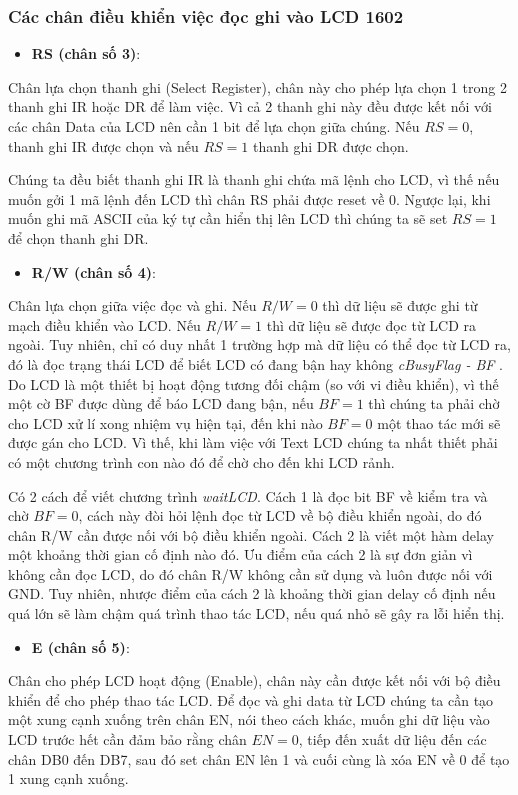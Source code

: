 \subsubsection{Các chân điều khiển việc đọc ghi vào LCD 1602}
\begin{itemize}
    \item \textbf{RS (chân số 3)}:
\end{itemize}
Chân lựa chọn thanh ghi (Select Register), chân này cho phép lựa chọn 1 trong 2 thanh ghi IR hoặc DR để làm việc.
Vì cả 2 thanh ghi này đều được kết nối với các chân Data của LCD nên cần 1 bit để lựa chọn giữa chúng.
Nếu \(RS = 0\), thanh ghi IR được chọn và nếu \(RS = 1\) thanh ghi DR được chọn.

Chúng ta đều biết thanh ghi IR là thanh ghi chứa mã lệnh cho LCD,
vì thế nếu muốn gởi 1 mã lệnh đến LCD thì chân RS phải được reset về 0.
Ngược lại, khi muốn ghi mã ASCII của ký tự cần hiển thị lên LCD thì chúng ta sẽ set \(RS = 1\) để chọn thanh ghi DR.
\begin{itemize}
    \item \textbf{R/W (chân số 4)}:
\end{itemize}
Chân lựa chọn giữa việc đọc và ghi.
Nếu \(R/W = 0\) thì dữ liệu sẽ được ghi từ mạch điều khiển vào LCD.
Nếu \(R/W = 1\) thì dữ liệu sẽ được đọc từ LCD ra ngoài.
Tuy nhiên, chỉ có duy nhất 1 trường hợp mà dữ liệu có thể đọc từ LCD ra,
đó là đọc trạng thái LCD để biết LCD có đang bận hay không \emph{cBusyFlag - BF} .
Do LCD là một thiết bị hoạt động tương đối chậm (so với vi điều khiển),
vì thế một cờ BF được dùng để báo LCD đang bận, nếu \(BF = 1\) thì chúng ta phải chờ cho LCD xử lí xong nhiệm vụ hiện tại,
đến khi nào \(BF = 0\) một thao tác mới sẽ được gán cho LCD.
Vì thế, khi làm việc với Text LCD chúng ta nhất thiết phải có một chương trình con nào đó để chờ cho đến khi LCD rảnh.

Có 2 cách để viết chương trình \emph{waitLCD}.
Cách 1 là đọc bit BF về kiểm tra và chờ \(BF = 0\),
cách này đòi hỏi lệnh đọc từ LCD về bộ điều khiển ngoài, do đó chân R/W cần được nối với bộ điều khiển ngoài.
Cách 2 là viết một hàm delay một khoảng thời gian cố định nào đó. %
Ưu điểm của cách 2 là sự đơn giản vì không cần đọc LCD, do đó chân R/W không cần sử dụng và luôn được nối với GND.
Tuy nhiên, nhược điểm của cách 2 là khoảng thời gian delay cố định nếu quá lớn sẽ làm chậm quá trình thao tác LCD,
nếu quá nhỏ sẽ gây ra lỗi hiển thị.
\begin{itemize}
    \item \textbf{E (chân số 5)}:
\end{itemize}
Chân cho phép LCD hoạt động (Enable), chân này cần được kết nối với bộ điều khiển để cho phép thao tác LCD.
Để đọc và ghi data từ LCD chúng ta cần tạo một xung cạnh xuống trên chân EN,
nói theo cách khác, muốn ghi dữ liệu vào LCD trước hết cần đảm bảo rằng chân \(EN = 0\),
tiếp đến xuất dữ liệu đến các chân DB0 đến DB7, sau đó set chân EN lên 1 và cuối cùng là xóa EN về 0 để tạo 1 xung cạnh xuống.
